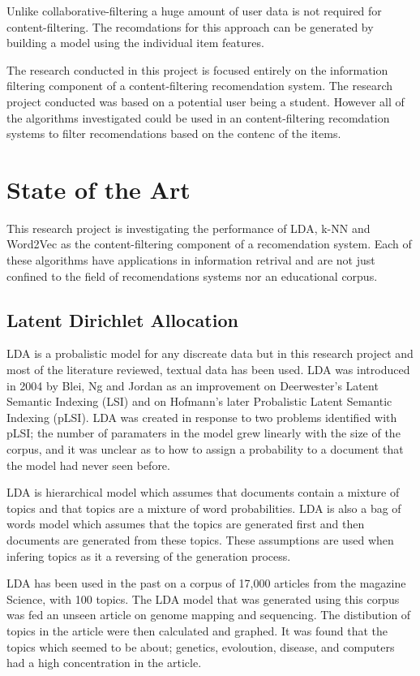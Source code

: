 Unlike collaborative-filtering a huge amount of user data is not required for content-filtering.
The recomdations for this approach can be generated by building a model using the individual item features.

The research conducted in this project is focused entirely on the information filtering component of a content-filtering recomendation system.
The research project conducted was based on a potential user being a student.
However all of the algorithms investigated could be used in an content-filtering recomdation systems to filter recomendations based on the contenc of the items.

\section{State of the Art}
This research project is investigating the performance of LDA, k-NN and Word2Vec as the content-filtering component of a recomendation system.
Each of these algorithms have applications in information retrival and are not just confined to the field of recomendations systems nor an educational corpus.

\subsection{Latent Dirichlet Allocation}
LDA is a probalistic model for any discreate data but in this research project and most of the literature reviewed, textual data has been used.
LDA was introduced in 2004 by Blei, Ng and Jordan as an improvement on Deerwester's Latent Semantic Indexing (LSI) and on Hofmann's later Probalistic Latent Semantic Indexing (pLSI).
LDA was created in response to two problems identified with pLSI; the number of paramaters in the model grew linearly with the size of the corpus, and it was unclear as to how to assign a probability to a document that the model had never seen before\cite{LDAintro}.

LDA is hierarchical model which assumes that documents contain a mixture of topics and that topics are a mixture of word probabilities.
LDA is also a bag of words model which assumes that the topics are generated first and then documents are generated from these topics.
These assumptions are used when infering topics as it a reversing of the generation process\cite{LDAintro}.

LDA has been used in the past on a corpus of 17,000 articles from the magazine Science, with 100 topics.
The LDA model that was generated using this corpus was fed an unseen article on genome mapping and sequencing.
The distibution of topics in the article were then calculated and graphed.
It was found that the topics which seemed to be about; genetics, evoloution, disease, and computers had a high concentration in the article\cite{ACMTopicModel}.

